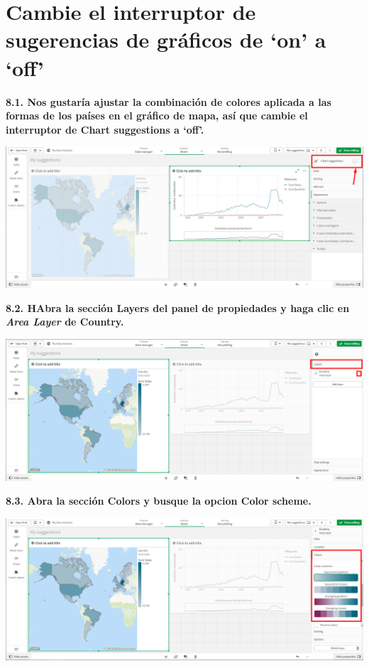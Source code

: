\documentclass{article}
\begin{document}
	
\newpage	
\section{Cambie el interruptor de sugerencias de 
gráficos de ‘on’ a ‘off’}

\textbf{8.1. Nos gustaría ajustar la combinación de colores 
aplicada a las formas de los países en el gráfico de mapa, así
 que cambie el interruptor de \textbf{Chart suggestions} a \textbf{‘off’}.}

    \begin{center}
		\includegraphics[width=14cm]{./images/24} 
	\end{center}
	
\textbf{8.2. HAbra la sección \textbf{Layers} del panel de
 propiedades y haga clic en \textit{Area Layer} de \textbf{Country}.}

    \begin{center}
		\includegraphics[width=14cm]{./images/25} 
	\end{center}
\newpage	
\textbf{8.3. Abra la sección \textbf{Colors} y busque 
la opcion \textbf{Color scheme}.}

    \begin{center}
		\includegraphics[width=14cm]{./images/26} 
	\end{center}
	
\end{document}
